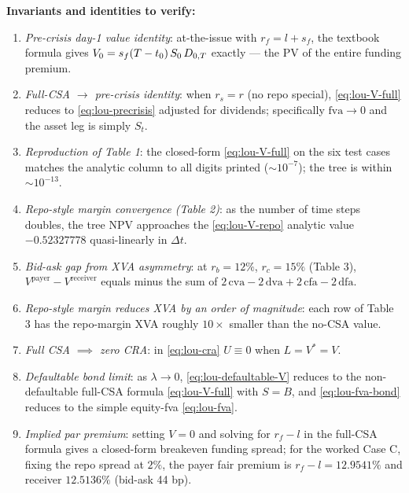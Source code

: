 \documentclass[11pt,a4paper]{article}
\begin{document}
\begin{validation}
\textbf{Invariants and identities to verify:}
\begin{enumerate}[noitemsep]
  \item \emph{Pre-crisis day-1 value identity}: at-the-issue with
        $r_f = l + s_f$, the textbook formula gives
        $V_0 = s_f (T - t_0)\, S_0\, D_{0,T}$ exactly --- the PV
        of the entire funding premium.
  \item \emph{Full-CSA $\to$ pre-crisis identity}: when $r_s = r$
        (no repo special), \eqref{eq:lou-V-full} reduces to
        \eqref{eq:lou-precrisis} adjusted for dividends; specifically
        $\mathrm{fva} \to 0$ and the asset leg is simply $S_t$.
  \item \emph{Reproduction of Table 1}: the closed-form
        \eqref{eq:lou-V-full} on the six test cases matches the
        analytic column to all digits printed ($\sim 10^{-7}$); the
        tree is within $\sim 10^{-13}$.
  \item \emph{Repo-style margin convergence (Table 2)}: as the
        number of time steps doubles, the tree NPV approaches the
        \eqref{eq:lou-V-repo} analytic value $-0.52327778$
        quasi-linearly in $\Delta t$.
  \item \emph{Bid-ask gap from XVA asymmetry}: at $r_b = 12\%$,
        $r_c = 15\%$ (Table 3), $V^{\text{payer}} - V^{\text{receiver}}$
        equals minus the sum of $2\,\mathrm{cva} - 2\,\mathrm{dva} + 2\,\mathrm{cfa} - 2\,\mathrm{dfa}$.
  \item \emph{Repo-style margin reduces XVA by an order of magnitude}:
        each row of Table 3 has the repo-margin XVA roughly $10\times$
        smaller than the no-CSA value.
  \item \emph{Full CSA $\implies$ zero CRA}: in \eqref{eq:lou-cra}
        $U \equiv 0$ when $L = V^* = V$.
  \item \emph{Defaultable bond limit}: as $\lambda \to 0$,
        \eqref{eq:lou-defaultable-V} reduces to the non-defaultable
        full-CSA formula \eqref{eq:lou-V-full} with $S = B$, and
        \eqref{eq:lou-fva-bond} reduces to the simple equity-fva
        \eqref{eq:lou-fva}.
  \item \emph{Implied par premium}: setting $V = 0$ and solving for
        $r_f - l$ in the full-CSA formula gives a closed-form
        breakeven funding spread; for the worked Case C, fixing the
        repo spread at $2\%$, the payer fair premium is
        $r_f - l = 12.9541\%$ and receiver $12.5136\%$
        (bid-ask 44 bp).
\end{enumerate}
\end{validation}
\end{document}
